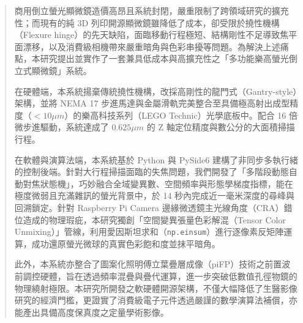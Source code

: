 
\begin{abstract}

商用倒立螢光顯微鏡造價高昂且系統封閉，嚴重限制了跨領域研究的擴充性；而現有的純 3D 列印開源顯微鏡雖降低了成本，卻受限於撓性機構（Flexure hinge）的先天缺陷，面臨移動行程極短、結構剛性不足導致焦平面漂移，以及消費級相機帶來嚴重暗角與色彩串擾等問題。為解決上述痛點，本研究提出並實作了一套兼具低成本與高擴充性之「多功能樂高螢光倒立式顯微鏡」系統。

在硬體端，本系統揚棄傳統撓性機構，改採高剛性的龍門式（Gantry-style）架構，並將 NEMA 17 步進馬達與金屬滑軌完美整合至具備極高射出成型精度（$<10 \mu m$）的樂高科技系列（LEGO Technic）光學底板中。配合 16 倍微步進驅動，系統達成了 $0.625 \mu m$ 的 Z 軸定位精度與數公分的大面積掃描行程。

在軟體與演算法端，本系統基於 Python 與 PySide6 建構了非同步多執行緒的控制後端。針對大行程掃描面臨的失焦問題，我們開發了「多階段動態自動對焦狀態機」，巧妙融合全域變異數、空間頻率與形態學梯度指標，能在極度微弱且充滿雜訊的螢光背景中，於 14 秒內完成近一毫米深度的尋峰與回溯鎖定。針對 Raspberry Pi Camera 邊緣微透鏡主光線角度（CRA）錯位造成的物理瑕疵，本研究獨創「空間變異張量色彩解混（Tensor Color Unmixing）」管線，利用愛因斯坦求和（\texttt{np.einsum}）進行逐像素反矩陣運算，成功還原螢光微球的真實色彩飽和度並抹平暗角。

此外，本系統亦整合了圖案化照明傅立葉疊層成像（piFP）技術之前置波前調控硬體，旨在透過頻率混疊與疊代運算，進一步突破低數值孔徑物鏡的物理繞射極限。本研究所開發之軟硬體開源架構，不僅大幅降低了生醫影像研究的經濟門檻，更證實了消費級電子元件透過嚴謹的數學演算法補償，亦能產出具備高度保真度之定量學術影像。

\end{abstract}

